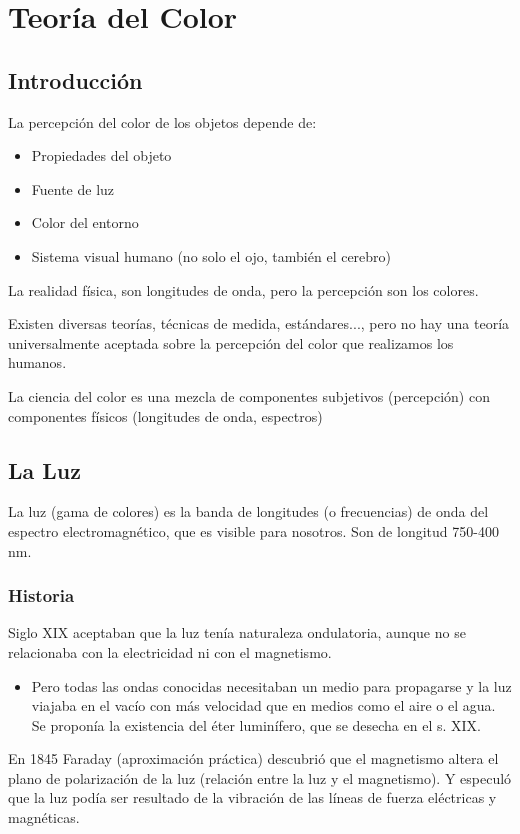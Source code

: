 \chapter{Teoría del Color}
\section{Introducción}
La percepción del color de los objetos depende de:
\begin{itemize}
    \item Propiedades del objeto
    \item Fuente de luz
    \item Color del entorno
    \item Sistema visual humano (no solo el ojo, también el cerebro)
\end{itemize}

La realidad física, son longitudes de onda, pero la percepción son los colores.

Existen diversas teorías, técnicas de medida, estándares..., pero no hay una teoría universalmente aceptada sobre la percepción del color que realizamos los humanos.

La ciencia del color es una mezcla de componentes subjetivos (percepción) con componentes físicos (longitudes de onda, espectros)

\section{La Luz}
La luz (gama de colores) es la banda de longitudes (o frecuencias) de onda del espectro electromagnético, que es visible para nosotros. Son de longitud 750-400 nm.

\subsection{Historia}
Siglo XIX aceptaban que la luz tenía naturaleza ondulatoria, aunque no se relacionaba con la electricidad ni con el magnetismo.
\begin{itemize}
    \item Pero todas las ondas conocidas necesitaban un medio para propagarse y la luz viajaba en el vacío con más velocidad que en medios como el aire o el agua. Se proponía la existencia del éter luminífero, que se desecha en el s. XIX.
\end{itemize}

En 1845 Faraday (aproximación práctica) descubrió que el magnetismo altera el plano de polarización de la luz (relación entre la luz y el magnetismo). Y especuló que la luz podía ser resultado de la vibración de las líneas de fuerza eléctricas y magnéticas. 

